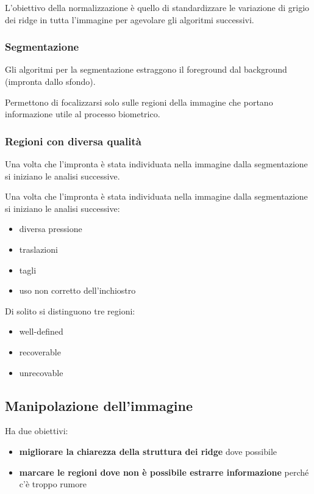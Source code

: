 L’obiettivo della normalizzazione è quello di standardizzare le
variazione di grigio dei ridge in tutta l’immagine per agevolare
gli algoritmi successivi.

\subsubsection{Segmentazione}

Gli algoritmi per la segmentazione estraggono il foreground
dal background (impronta dallo sfondo).

Permettono di focalizzarsi solo sulle regioni della immagine che 
portano informazione utile al processo biometrico.

\subsubsection{Regioni con diversa qualità}

Una volta che l’impronta è stata individuata nella immagine
dalla segmentazione si iniziano le analisi successive.

Una volta che l’impronta è stata individuata nella immagine
dalla segmentazione si iniziano le analisi successive:
\begin{itemize}
    \item diversa pressione
    \item traslazioni
    \item tagli
    \item uso non corretto dell'inchiostro
\end{itemize}

Di solito si distinguono tre regioni:
\begin{itemize}
    \item well-defined
    \item recoverable
    \item unrecovable
\end{itemize}

\subsection{Manipolazione dell'immagine}

Ha due obiettivi:
\begin{itemize}
    \item \textbf{migliorare la chiarezza della struttura dei ridge} dove possibile
    \item \textbf{marcare le regioni dove non è possibile estrarre informazione} perché c'è troppo rumore
\end{itemize}


